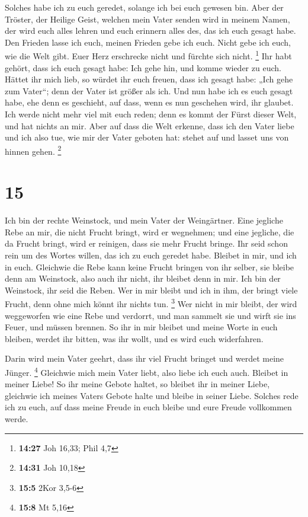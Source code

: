  Solches habe ich zu euch geredet, solange ich bei euch
gewesen bin.  Aber der Tröster, der Heilige Geist, welchen
mein Vater senden wird in meinem Namen, der wird euch alles lehren und
euch erinnern alles des, das ich euch gesagt habe.  Den
Frieden lasse ich euch, meinen Frieden gebe ich euch. Nicht gebe ich
euch, wie die Welt gibt. Euer Herz erschrecke nicht und fürchte sich
nicht. \footnote{\textbf{14:27} Joh 16,33; Phil 4,7}  Ihr
habt gehört, dass ich euch gesagt habe: Ich gehe hin, und komme wieder
zu euch. Hättet ihr mich lieb, so würdet ihr euch freuen, dass ich
gesagt habe: „Ich gehe zum Vater``; denn der Vater ist größer als ich.
 Und nun habe ich es euch gesagt habe, ehe denn es
geschieht, auf dass, wenn es nun geschehen wird, ihr glaubet.
 Ich werde nicht mehr viel mit euch reden; denn es kommt
der Fürst dieser Welt, und hat nichts an mir.  Aber auf
dass die Welt erkenne, dass ich den Vater liebe und ich also tue, wie
mir der Vater geboten hat: stehet auf und lasset uns von hinnen gehen.
\footnote{\textbf{14:31} Joh 10,18}

\hypertarget{section-5}{%
\section{15}\label{section-5}}

 Ich bin der rechte Weinstock, und mein Vater der
Weingärtner.  Eine jegliche Rebe an mir, die nicht Frucht
bringt, wird er wegnehmen; und eine jegliche, die da Frucht bringt, wird
er reinigen, dass sie mehr Frucht bringe.  Ihr seid schon
rein um des Wortes willen, das ich zu euch geredet habe. 
Bleibet in mir, und ich in euch. Gleichwie die Rebe kann keine Frucht
bringen von ihr selber, sie bleibe denn am Weinstock, also auch ihr
nicht, ihr bleibet denn in mir.  Ich bin der Weinstock, ihr
seid die Reben. Wer in mir bleibt und ich in ihm, der bringt viele
Frucht, denn ohne mich könnt ihr nichts tun. \footnote{\textbf{15:5}
  2Kor 3,5-6}  Wer nicht in mir bleibt, der wird weggeworfen
wie eine Rebe und verdorrt, und man sammelt sie und wirft sie ins Feuer,
und müssen brennen.  So ihr in mir bleibet und meine Worte
in euch bleiben, werdet ihr bitten, was ihr wollt, und es wird euch
widerfahren.

 Darin wird mein Vater geehrt, dass ihr viel Frucht bringet
und werdet meine Jünger. \footnote{\textbf{15:8} Mt 5,16} 
Gleichwie mich mein Vater liebt, also liebe ich euch auch. Bleibet in
meiner Liebe!  So ihr meine Gebote haltet, so bleibet ihr
in meiner Liebe, gleichwie ich meines Vaters Gebote halte und bleibe in
seiner Liebe.  Solches rede ich zu euch, auf dass meine
Freude in euch bleibe und eure Freude vollkommen werde.

